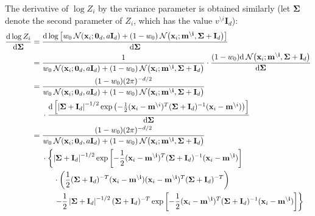 \documentclass[11pt]{article}
\newcommand{\vek}[1]{\ensuremath{\mathbf{#1}}}
\newcommand{\byd}{\ensuremath{\mathrm{d}}}
\newcommand{\norm}{\ensuremath{\:\mathcal{N}}}
\newcommand{\unity}{\ensuremath{\mathbf{I}}}
\begin{document}
The derivative of $\log Z_i$ by the variance parameter is obtained 
similarly (let $\vek{\Sigma}$ denote the second parameter of $Z_i$, which has 
the value $v^{\setminus i}\unity_d$):
\begin{align}
\frac{\byd \log Z_i}{\byd \vek{\Sigma}} &=
			\frac{\byd \log\left[ w_0  \norm(\vek{x}_i; \vek{0}_d, a\unity_{d})
			+  (1 - w_0)\norm\!\left(\vek{x}_i; \vek{m^{\setminus i}}, \vek{\Sigma} 
			+ \unity_d\right)
			\right]}{\byd \vek{\Sigma}} \\
			&=
			\frac{1}{w_0  \norm(\vek{x}_i; \vek{0}_d, a\unity_{d})
			+  (1 - w_0)\norm\!\left(\vek{x}_i; \vek{m^{\setminus i}}, \vek{\Sigma} 
			+ \unity_d\right)
			}%
			\cdot
			\frac{(1 - w_0)\byd
			\norm\!\left(\vek{x}_i; \vek{m^{\setminus i}}, \vek{\Sigma} + \unity_d\right)
			}{\byd \vek{\Sigma}} \\
			&=
			\frac{(1 - w_0)
				(2\pi)^{-d/2}}
			{w_0  \norm(\vek{x}_i; \vek{0}_d, a\unity_{d})
			+  (1 - w_0)\norm\!\left(\vek{x}_i; \vek{m^{\setminus i}}, \vek{\Sigma} 
			+ \unity_d\right)
			}\notag\\
		&\hphantom{=|}\mbox{}
			\cdot
			\frac{
			\byd\left[
			\left|\vek{\Sigma} + \unity_d\right|^{-1/2}
			\exp\left(-\frac{1}{2}
				(\vek{x}_i - \vek{m}^{\setminus i})^T
				(\vek{\Sigma} + \unity_d)^{-1}
				(\vek{x}_i - \vek{m}^{\setminus i})\right)\right]}
				{\byd \vek{\Sigma}} \\
			&=
			\frac{(1 - w_0)
				(2\pi)^{-d/2}}
			{w_0  \norm(\vek{x}_i; \vek{0}_d, a\unity_{d})
			+  (1 - w_0)\norm\!\left(\vek{x}_i; \vek{m^{\setminus i}}, \vek{\Sigma} 
			+ \unity_d\right)
			}\notag\\
			&\hphantom{=|}\mbox{}\cdot\left\{
     \left|\vek{\Sigma} + \unity_d\right|^{-1/2}%
						\exp\left[-\frac{1}{2}(\vek{x}_i - \vek{m^{\setminus 
				i}})^T(\vek{\Sigma} + \unity_d)^{-1}(\vek{x}_i - \vek{m^{\setminus 
				i}})\right]\right.\notag\\%
			&\hphantom{=|\cdot\Bigg\{}\mbox{}
				\cdot\left(\frac{1}{2}(\vek{\Sigma} + \unity_d)^{-T}(\vek{x}_i - \vek{m^{\setminus 
				i}})(\vek{x}_i - \vek{m^{\setminus i}})^T(\vek{\Sigma} + \unity_d)^{-T}\right)
				\notag\\
			&\hphantom{=|\cdot\Bigg\{}\mbox{}\left.
					- \frac{1}{2}\left|\vek{\Sigma} + \unity_d\right|^{-1/2}
					(\vek{\Sigma} + \unity_d)^{-T}
					\exp\left[-\frac{1}{2}(\vek{x}_i - \vek{m^{\setminus i}})^T(\vek{\Sigma} + \unity_d)^{-1}
										 (\vek{x}_i - \vek{m^{\setminus i}})\right]\right\}\\

\end{align}
\end{document}
